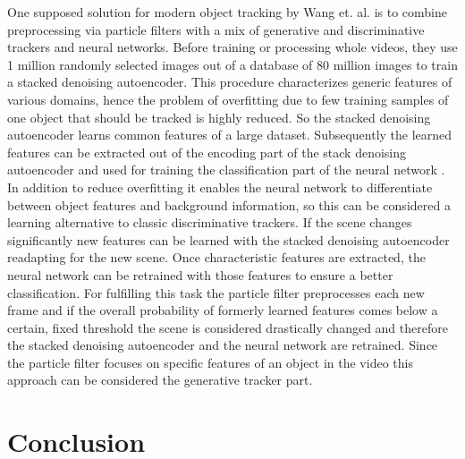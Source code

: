 \documentclass[12pt,twoside]{article}
\theoremstyle{plain}
\theoremstyle{definition}
\theoremstyle{remark}
\begin{document}
One supposed solution for modern object tracking by Wang et. al. \cite{LearningDeepCompactImageTracking-Wang} is to combine preprocessing via particle filters with a mix of generative and discriminative trackers and neural networks. Before training or processing whole videos, they use 1 million randomly selected images out of a database of 80 million images to train a stacked denoising autoencoder. This procedure characterizes generic features of various domains, hence the problem of overfitting due to few training samples of one object that should be tracked is highly reduced. So the stacked denoising autoencoder learns common features of a large dataset. Subsequently the learned features can be extracted out of the encoding part of the stack denoising autoencoder and used for training the classification part of the neural network \cite{LearningDeepCompactImageTracking-Wang}. In addition to reduce overfitting it enables the neural network to differentiate between object features and background information, so this can be considered a learning alternative to classic discriminative trackers. If the scene changes significantly new features can be learned with the stacked denoising autoencoder readapting for the new scene. Once characteristic features are extracted, the neural network can be retrained with those features to ensure a better classification. For fulfilling this task the particle filter preprocesses each new frame and if the overall probability of formerly learned features comes below a certain, fixed threshold the scene is considered drastically changed and therefore the stacked denoising autoencoder and the neural network are retrained. Since the particle filter focuses on specific features of an object in the video this approach can be considered the generative tracker part.



\section{Conclusion}
\label{sec:concl}
\end{document}
